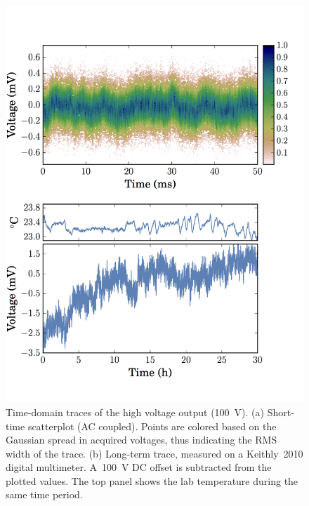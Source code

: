 \documentclass[aip,rsi,reprint]{revtex4-1} %
\begin{document}
\begin{figure}[t]
\includegraphics[width=\columnwidth]{fig/TimeDomain.pdf}
\caption{Time-domain traces of the high voltage output (\SI{100}{\volt}). (a) Short-time scatterplot  (AC coupled). Points are colored based on the Gaussian spread in acquired voltages, thus indicating the RMS width of the trace. (b) Long-term trace, measured on a Keithly~2010 digital multimeter. A~\SI{100}{\volt} DC offset is subtracted from the plotted values. The top panel shows the lab temperature during the same time period.\label{Fig:TimeDomain}}
\end{figure}
\end{document}
